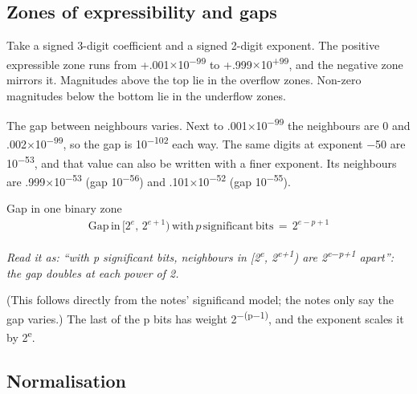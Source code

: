 \documentclass[11pt]{article}
\begin{document}
\begin{keepsection}
\begin{keepsection}
\subsection{Zones of expressibility and gaps}

Take a signed 3-digit coefficient and a signed 2-digit exponent. The positive expressible zone runs from +.001\ensuremath{\times}10\textsuperscript{\ensuremath{-}99} to +.999\ensuremath{\times}10\textsuperscript{+99}, and the negative zone mirrors it. Magnitudes above the top lie in the overflow zones. Non-zero magnitudes below the bottom lie in the underflow zones.

The gap between neighbours varies. Next to .001\ensuremath{\times}10\textsuperscript{\ensuremath{-}99} the neighbours are 0 and .002\ensuremath{\times}10\textsuperscript{\ensuremath{-}99}, so the gap is 10\textsuperscript{\ensuremath{-}102} each way. The same digits at exponent \ensuremath{-}50 are 10\textsuperscript{\ensuremath{-}53}, and that value can also be written with a finer exponent. Its neighbours are .999\ensuremath{\times}10\textsuperscript{\ensuremath{-}53} (gap 10\textsuperscript{\ensuremath{-}56}) and .101\ensuremath{\times}10\textsuperscript{\ensuremath{-}52} (gap 10\textsuperscript{\ensuremath{-}55}).

\begin{equationcard}{Gap in one binary zone}
\[ \begin{gathered} \text{Gap}\, \text{in}\, [2^{{e}},\, 2^{{e}+1})\, \text{with}\, {p}\, \text{significant}\, \text{bits}\, =\, 2^{{e}-{p}+1} \end{gathered} \]
{\small \emph{Read it as: “with p significant bits, neighbours in [2\textsuperscript{e}, 2\textsuperscript{e+1}) are 2\textsuperscript{e\ensuremath{-}p+1} apart”: the gap doubles at each power of 2.}\par (This follows directly from the notes’ significand model; the notes only say the gap varies.) The last of the p bits has weight 2\textsuperscript{\ensuremath{-}(p\ensuremath{-}1)}, and the exponent scales it by 2\textsuperscript{e}.}
\end{equationcard}
\end{keepsection}

\begin{keepsection}
\subsection{Normalisation}


\end{keepsection}
\end{keepsection}
\end{document}
